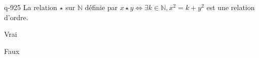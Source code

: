 \begin{truefalse}{q-925}
La relation $\star$ sur $\mathbb N$ définie par $x\star y \iff \exists k\in\mathbb N, x^2=k+y^2$ est une relation d'ordre.
\item* Vrai
\item Faux
\end{truefalse}

